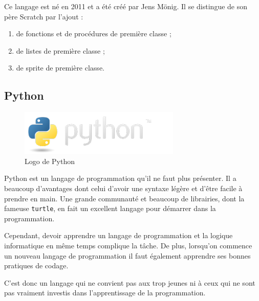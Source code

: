 Ce langage est né en 2011 et a été créé par Jens Mönig. Il se distingue de son père Scratch par l'ajout :
\begin{enumerate}
\item de fonctions et de procédures de première classe ;
\item de listes de première classe ;
\item de sprite de première classe.
\end{enumerate}

\subsection{Python}
\begin{figure}[!h]
  \begin{center}
    \includegraphics[scale=0.4]{content/5-related_work/images/python}
    \caption{Logo de Python}
    \label{fig:python}
  \end{center}
\end{figure}
Python est un langage de programmation qu'il ne faut plus présenter. Il a beaucoup d'avantages dont celui d'avoir une syntaxe légère et d'être facile à prendre en main. Une grande communauté et beaucoup de librairies, dont la fameuse \texttt{turtle}, en fait un excellent langage pour démarrer dans la programmation.

Cependant, devoir apprendre un langage de programmation et la logique informatique en même temps complique la tâche. De plus, lorsqu'on commence un nouveau langage de programmation il faut également apprendre ses bonnes pratiques de codage.

C'est donc un langage qui ne convient pas aux trop jeunes ni à ceux qui ne sont pas vraiment investis dans l'apprentissage de la programmation.
